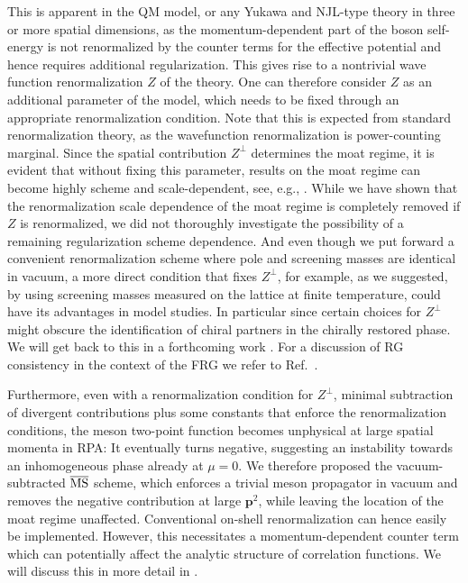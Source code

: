 \documentclass[reprint,english,superscriptaddress,preprintnumbers,amsmath,amssymb,aps,prd]{revtex4-2}
\begin{document}
This is apparent in the QM model, or any Yukawa and NJL-type theory in three or more spatial dimensions, as the momentum-dependent part of the boson self-energy is not renormalized by the counter terms for the effective potential and hence requires additional regularization. This gives rise to a nontrivial wave function renormalization $Z$ of the theory. One can therefore consider $Z$ as an additional parameter of the model, which needs to be fixed through an appropriate renormalization condition. Note that this is expected from standard renormalization theory, as the wavefunction renormalization is power-counting marginal. Since the spatial contribution $Z^\perp$ determines the moat regime, it is evident that without fixing this parameter, results on the moat regime can become highly scheme and scale-dependent, see, e.g., \cite{Partyka:2008sv, Buballa:2020nsi, Pannullo:2023cat, Pannullo:2024sov}. While we have shown that the renormalization scale dependence of the moat regime is completely removed if $Z$ is renormalized, we did not thoroughly investigate the possibility of a remaining regularization scheme dependence. And even though we put forward a convenient renormalization scheme where pole and screening masses are identical in vacuum, a more direct condition that fixes $Z^\perp$, for example, as we suggested, by using screening masses measured on the lattice at finite temperature, could have its advantages in model studies. In particular since certain choices for $Z^\perp$ might obscure the identification of chiral partners in the chirally restored phase. We will get back to this in a forthcoming work \cite{DM2}. For a discussion of RG consistency in the context of the FRG we refer to Ref.\ \cite{Braun:2018svj}. 

Furthermore, even with a renormalization condition for $Z^\perp$, minimal subtraction of divergent contributions plus some constants that enforce the renormalization conditions, the meson two-point function becomes unphysical at large spatial momenta in RPA: It eventually turns negative, suggesting an instability towards an inhomogeneous phase already at $\mu=0$. We therefore proposed the vacuum-subtracted $\overline{\rm MS}$ scheme, which enforces a trivial meson propagator in vacuum and removes the negative contribution at large $\boldsymbol{p}^2$, while leaving the location of the moat regime unaffected. Conventional on-shell renormalization can hence easily be implemented. However, this necessitates a momentum-dependent counter term which can potentially affect the analytic structure of correlation functions. We will discuss this in more detail in \cite{DM2}.
\end{document}
